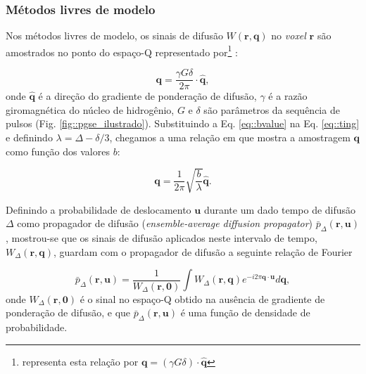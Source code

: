 \documentclass[
    12pt,                %
    oneside,            %
    a4paper,            %
    english,            %
    french,                %
    spanish,            %
    brazil                %
    ]{abntex2}
\begin{document}
\subsubsection{Métodos livres de modelo}
\label{metodos_livres_de_modelo}

Nos métodos livres de modelo, os sinais de difusão $W(\mathbf{r}, \mathbf{q})$ no \textit{voxel} $\mathbf{r}$ são amostrados no ponto do espaço-Q representado por\footnote{ representa esta relação por $\mathbf{q} = (\gamma G \delta)\cdot \mathbf{\hat{q}}$} \cite{yeh2010}:

\begin{equation}
    \label{eq::ting}
    \mathbf{q} = \frac{\gamma G \delta}{2\pi} \cdot \mathbf{\hat{q}},
\end{equation}
onde $\mathbf{\hat{q}}$ é a direção do gradiente de ponderação de difusão, $\gamma$ é a razão giromagnética do núcleo de hidrogênio, $G$ e $\delta$ são parâmetros da sequência de pulsos (Fig. \ref{fig::pgse_ilustrado}). Substituindo a Eq. \ref{eq::bvalue} na Eq. \ref{eq::ting} e definindo $\lambda = \Delta - \delta/3$, chegamos a uma relação em que mostra a amostragem $\mathbf{q}$ como função dos valores $b$:

\begin{equation}
\label{eq::qspace_bvalue}
\mathbf{q} = \frac{1}{2\pi}\sqrt{\frac{b}{\lambda}} \mathbf{\hat{q}}.
\end{equation}

Definindo a probabilidade de deslocamento $\mathbf{u}$ durante um dado tempo de difusão $\Delta$ como propagador de difusão (\textit{ensemble-average diffusion propagator}) $\bar{p}_{\Delta}(\mathbf{r}, \mathbf{u})$,  mostrou-se que os sinais de difusão aplicados neste intervalo de tempo, $W_{\Delta}(\mathbf{r}, \mathbf{q})$, guardam com o propagador de difusão a seguinte relação de Fourier 


\begin{equation}
\label{eq::propagator}
    \bar{p}_{\Delta}(\mathbf{r}, \mathbf{u}) =\frac{1}{W_{\Delta}(\mathbf{r},\mathbf{0}) } \int W_{\Delta}(\mathbf{r},\mathbf{q}) e^{-i2 \pi \mathbf{q} \cdot \mathbf{u}} d \mathbf{q} ,
\end{equation}
onde $W_{\Delta}(\mathbf{r},\mathbf{0})$ é o sinal no espaço-Q obtido na ausência de gradiente de ponderação de difusão, e que $\bar{p}_{\Delta}(\mathbf{r}, \mathbf{u})$ é uma função de densidade de probabilidade.
\end{document}
